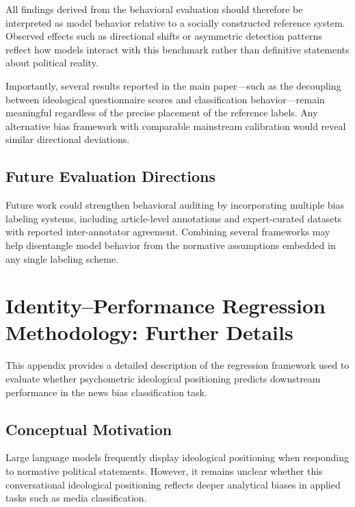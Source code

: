 \documentclass[11pt]{article}
\begin{document}
All findings derived from the behavioral evaluation should therefore be
interpreted as model behavior relative to a socially constructed reference
system. Observed effects such as directional shifts or asymmetric detection
patterns reflect how models interact with this benchmark rather than
definitive statements about political reality.

Importantly, several results reported in the main paper—such as the
decoupling between ideological questionnaire scores and classification
behavior—remain meaningful regardless of the precise placement of the
reference labels. Any alternative bias framework with comparable
mainstream calibration would reveal similar directional deviations.

\subsection{Future Evaluation Directions}

Future work could strengthen behavioral auditing by incorporating multiple
bias labeling systems, including article-level annotations and
expert-curated datasets with reported inter-annotator agreement.
Combining several frameworks may help disentangle model behavior from
the normative assumptions embedded in any single labeling scheme.







\section{Identity--Performance Regression Methodology: Further Details}
\label{app:decoupling_method}

This appendix provides a detailed description of the regression framework used to evaluate whether psychometric ideological positioning predicts downstream performance in the news bias classification task.

\subsection{Conceptual Motivation}

Large language models frequently display ideological positioning when responding to normative political statements. However, it remains unclear whether this conversational ideological positioning reflects deeper analytical biases in applied tasks such as media classification.
\end{document}

